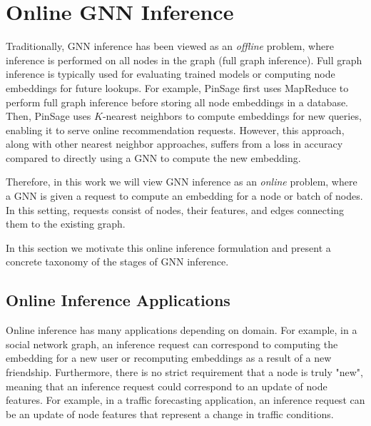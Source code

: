 \section{Online GNN Inference}
Traditionally, GNN inference has been viewed as an \textit{offline} problem, where inference is performed on all nodes in the graph (full graph inference).
Full graph inference is typically used for evaluating trained models or computing node embeddings for future lookups. 
For example, PinSage \cite{Recsys_PinSAGE_2018} first uses MapReduce \cite{MapReduce_2004} to perform full graph inference before storing all node embeddings in a database.
Then, PinSage uses $K$-nearest neighbors to compute embeddings for new queries, enabling it to serve online recommendation requests.
However, this approach, along with other nearest neighbor approaches, suffers from a loss in accuracy compared to directly using a GNN to compute the new embedding.

Therefore, in this work we will view GNN inference as an \textit{online} problem, where a GNN is given a request to compute an embedding for a node or batch of nodes. In this setting, requests consist of nodes, their features, and edges connecting them to the existing graph.

In this section we motivate this online inference formulation and present a concrete taxonomy of the stages of GNN inference.

\subsection{Online Inference Applications}
Online inference has many applications depending on domain.
For example, in a social network graph, an inference request can correspond to computing the embedding for a new user or recomputing embeddings as a result of a new friendship. 
Furthermore, there is no strict requirement that a node is truly "new", meaning that an inference request could correspond to an update of node features.
For example, in a traffic forecasting application, an inference request can be an update of node features that represent a change in traffic conditions.


